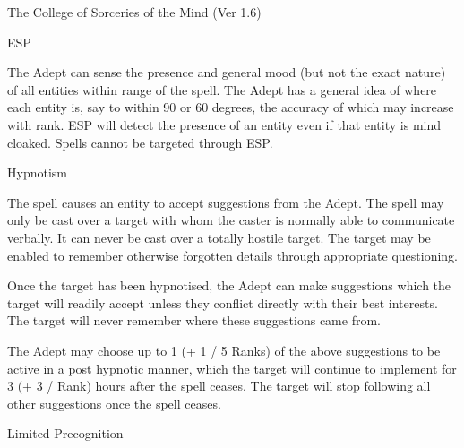 \begin{Chapter}{The College of Sorceries of the Mind (Ver 1.6)}
\begin{spell}[G-4]{ESP }

\begin{effects}
The Adept can sense the presence and general mood (but not the exact
nature) of all entities within range of the spell.  The Adept has a
general idea of where each entity is, say to within 90 or 60 degrees,
the accuracy of which may increase with rank.  ESP will detect the
presence of an entity even if that entity is mind cloaked. Spells
cannot be targeted through ESP.
\end{effects}
\end{spell}

\begin{spell}[G-5]{Hypnotism }

\begin{effects}
The spell causes an entity to accept suggestions from the Adept.  The
spell may only be cast over a target with whom the caster is normally
able to communicate verbally.  It can never be cast over a totally
hostile target.  The target may be enabled to remember otherwise
forgotten details through appropriate questioning.

Once the target has been hypnotised, the Adept can make suggestions
which the target will readily accept unless they conflict directly
with their best interests.  The target will never remember where these
suggestions came from.

The Adept may choose up to 1 (+ 1 / 5 Ranks) of the above suggestions
to be active in a post hypnotic manner, which the target will continue
to implement for 3 (+ 3 / Rank) hours after the spell ceases.  The
target will stop following all other suggestions once the spell
ceases.
\end{effects}
\end{spell}

\begin{spell}[G-6]{Limited Precognition }


\end{spell}
\end{Chapter}
